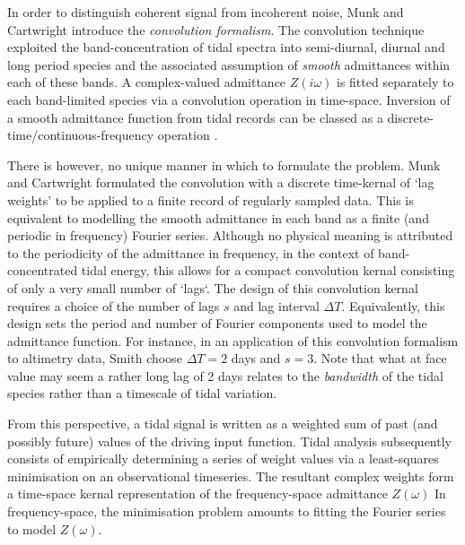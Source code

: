 In order to distinguish coherent signal from incoherent noise, Munk and Cartwright introduce the \emph{convolution formalism}. The convolution technique exploited the band-concentration of tidal spectra into semi-diurnal, diurnal and long period species and the associated assumption of \emph{smooth} admittances within each of these bands.  A complex-valued admittance $Z(i\omega)$ is fitted separately to each band-limited species via a convolution operation in time-space. 
Inversion of a smooth admittance function from tidal records can be classed as a discrete-time/continuous-frequency operation \citep{Percival:1998tw}.

There is however, no unique manner in which to formulate the problem.  Munk and Cartwright formulated the convolution with a discrete time-kernal of `lag weights' to be applied to a finite record of regularly sampled data. %
This is equivalent to modelling the smooth admittance in each band as a finite (and periodic in frequency) Fourier series.   Although no physical meaning is attributed to the periodicity of the admittance in frequency, in the context of band-concentrated tidal energy, this allows for a compact convolution kernal consisting of only a very small number of `lags`.   The design of this convolution kernal requires a choice of the number of lags $s$ and lag interval $\Delta T$.  Equivalently, this design sets the period and number of Fourier components used to model the admittance function.  For instance, in an application of this convolution formalism to altimetry data, Smith \citep{Smith:1997ut} choose $\Delta T=2$ days and $s=3$.   Note that what at face value may seem a rather long lag of 2 days relates to the \emph{bandwidth} of the tidal species rather than a timescale of tidal variation.

From this perspective, a tidal signal is written as a weighted sum of past (and possibly future) values of the driving input function. 
Tidal analysis subsequently consists of empirically determining a series of weight values  via a least-squares minimisation on an observational timeseries.
The resultant complex weights form a time-space kernal representation of the frequency-space admittance $Z(\omega)$   In frequency-space, the minimisation problem amounts to fitting the Fourier series to model $Z(\omega)$.


